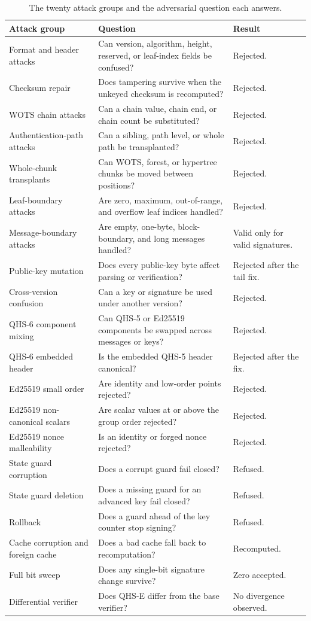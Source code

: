 \documentclass[11pt,a4paper]{article}
\begin{document}
\begin{table}[ht]
\centering
\caption{The twenty attack groups and the adversarial question each answers.}
\label{tab:attackcatalogue}
\footnotesize
\begin{tabularx}{\textwidth}{@{}>{\raggedright\arraybackslash}p{4.0cm}Y>{\raggedright\arraybackslash}p{2.4cm}@{}}
\toprule
Attack group & Question & Result\\
\midrule
Format and header attacks & Can version, algorithm, height, reserved, or leaf-index fields be confused? & Rejected.\\
Checksum repair & Does tampering survive when the unkeyed checksum is recomputed? & Rejected.\\
WOTS chain attacks & Can a chain value, chain end, or chain count be substituted? & Rejected.\\
Authentication-path attacks & Can a sibling, path level, or whole path be transplanted? & Rejected.\\
Whole-chunk transplants & Can WOTS, forest, or hypertree chunks be moved between positions? & Rejected.\\
Leaf-boundary attacks & Are zero, maximum, out-of-range, and overflow leaf indices handled? & Rejected.\\
Message-boundary attacks & Are empty, one-byte, block-boundary, and long messages handled? & Valid only for valid signatures.\\
Public-key mutation & Does every public-key byte affect parsing or verification? & Rejected after the tail fix.\\
Cross-version confusion & Can a key or signature be used under another version? & Rejected.\\
QHS-6 component mixing & Can QHS-5 or Ed25519 components be swapped across messages or keys? & Rejected.\\
QHS-6 embedded header & Is the embedded QHS-5 header canonical? & Rejected after the fix.\\
Ed25519 small order & Are identity and low-order points rejected? & Rejected.\\
Ed25519 non-canonical scalars & Are scalar values at or above the group order rejected? & Rejected.\\
Ed25519 nonce malleability & Is an identity or forged nonce rejected? & Rejected.\\
State guard corruption & Does a corrupt guard fail closed? & Refused.\\
State guard deletion & Does a missing guard for an advanced key fail closed? & Refused.\\
Rollback & Does a guard ahead of the key counter stop signing? & Refused.\\
Cache corruption and foreign cache & Does a bad cache fall back to recomputation? & Recomputed.\\
Full bit sweep & Does any single-bit signature change survive? & Zero accepted.\\
Differential verifier & Does QHS-E differ from the base verifier? & No divergence observed.\\
\bottomrule
\end{tabularx}
\end{table}
\FloatBarrier
\end{document}
